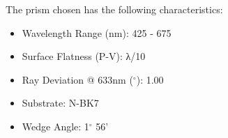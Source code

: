 The prism chosen has the following characteristics:
\begin{itemize}
    \item Wavelength Range (nm): 425 - 675
    \item Surface Flatness (P-V): λ/10
    \item Ray Deviation @ 633nm ($^{\circ}$): 1.00
    \item Substrate: N-BK7
    \item Wedge Angle: 1$^{\circ}$ 56'
\end{itemize}
\newpage

